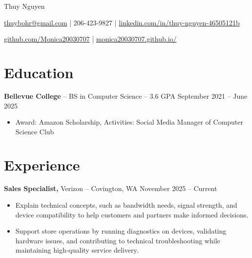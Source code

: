 \documentclass[11pt]{article}       %
\begin{document}
\centerline{\Huge Thuy Nguyen}

\vspace{5pt}

\centerline{\href{mailto:thuybohr@gmail.com}{thuybohr@gmail.com} | 206-423-9827 |
\href{https://www.linkedin.com/in/thuy-nguyen-46505121b/}{linkedin.com/in/thuy-nguyen-46505121b}}

\centerline{\href{https://github.com/Monica20030707}{github.com/Monica20030707} | 
\href{https://monica20030707.github.io/}{monica20030707.github.io/}} 

\vspace{-9pt}

\section*{Education}
\textbf{Bellevue College} -- BS in Computer Science -- 3.6 GPA \hfill September 2021 -- June 2025\\
\vspace{-9pt}
\begin{itemize}
  \item Award: Amazon Scholarship, Activities: Social Media Manager of Computer Science Club
\end{itemize}

\vspace{-18.5pt}

\section*{Experience}

\textbf{Sales Specialist,} {Verizon} -- Covington, WA \hfill November 2025 -- Current \\
\vspace{-9pt}
\begin{itemize}
  \item Explain technical concepts, such as bandwidth needs, signal strength, and device compatibility to help customers and partners make informed decisions.
  \item Support store operations by running diagnostics on devices, validating hardware issues, and contributing to technical troubleshooting while maintaining high-quality service delivery.
\end{itemize}
\end{document}
